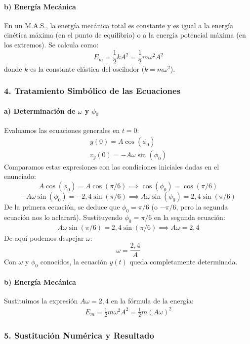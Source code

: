 \paragraph*{b) Energía Mecánica}
En un M.A.S., la energía mecánica total es constante y es igual a la energía cinética máxima (en el punto de equilibrio) o a la energía potencial máxima (en los extremos). Se calcula como:
$$ E_m = \frac{1}{2} k A^2 = \frac{1}{2} m \omega^2 A^2 $$
donde $k$ es la constante elástica del oscilador ($k=m\omega^2$).

\subsubsection*{4. Tratamiento Simbólico de las Ecuaciones}
\paragraph*{a) Determinación de $\omega$ y $\phi_0$}
Evaluamos las ecuaciones generales en $t=0$:
\begin{gather}
    y(0) = A \cos(\phi_0) \\
    v_y(0) = -A\omega \sin(\phi_0)
\end{gather}
Comparamos estas expresiones con las condiciones iniciales dadas en el enunciado:
$$ A \cos(\phi_0) = A \cos(\pi/6) \implies \cos(\phi_0) = \cos(\pi/6) $$
$$ -A\omega \sin(\phi_0) = -2,4 \sin(\pi/6) \implies A\omega \sin(\phi_0) = 2,4 \sin(\pi/6) $$
De la primera ecuación, se deduce que $\phi_0 = \pi/6$ (o $-\pi/6$, pero la segunda ecuación nos lo aclarará).
Sustituyendo $\phi_0 = \pi/6$ en la segunda ecuación:
\begin{gather}
    A\omega \sin(\pi/6) = 2,4 \sin(\pi/6) \implies A\omega = 2,4
\end{gather}
De aquí podemos despejar $\omega$:
$$ \omega = \frac{2,4}{A} $$
Con $\omega$ y $\phi_0$ conocidos, la ecuación $y(t)$ queda completamente determinada.

\paragraph*{b) Energía Mecánica}
Sustituimos la expresión $A\omega = 2,4$ en la fórmula de la energía:
\begin{gather}
    E_m = \frac{1}{2} m \omega^2 A^2 = \frac{1}{2} m (A\omega)^2
\end{gather}

\subsubsection*{5. Sustitución Numérica y Resultado}
